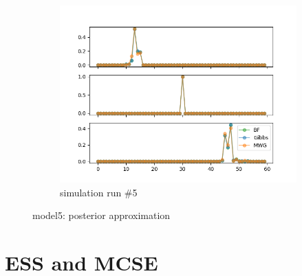 \begin{figure}[H]
\begin{subfigure}{.3\textwidth}
    	\includegraphics[width=\linewidth]{../../plots/Posterior_post_burnin_M4_N60_NMCMC3_seed4_diffind2.png}
    	\caption{simulation run \#5}
	\end{subfigure}
	\caption{model5: posterior approximation}
\end{figure}

\section{ESS and MCSE}

